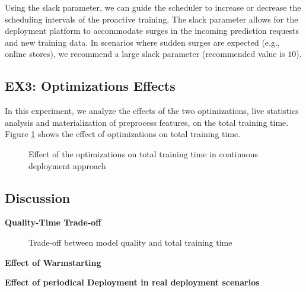 Using the slack parameter, we can guide the scheduler to increase or decrease the scheduling intervals of the proactive training.
The slack parameter allows for the deployment platform to accommodate surges in the incoming prediction requests and new training data.
In scenarios where sudden surges are expected (e.g., online stores), we recommend a large slack parameter (recommended value is $10$). 

\subsection{EX3: Optimizations Effects}
In this experiment, we analyze the effects of the two optimizations, live statistics analysis and materialization of preprocess features, on the total training time.
Figure \ref{optimization-effect} shows the effect of optimizations on total training time.
\begin{figure}[h!]
\centering
\resizebox{\columnwidth}{!}{}
\caption{Effect of the optimizations on total training time in continuous deployment approach}
\label{optimization-effect}
\end{figure}

\subsection{Discussion} \label{subsec:discussion}
\textbf{Quality-Time Trade-off}

\begin{figure}[!h]
\centering
\resizebox{\columnwidth}{!}{}
\caption{Trade-off between model quality and total training time}
\label{quality-vs-time}
\end{figure}

\textbf{Effect of Warmstarting}

\textbf{Effect of periodical Deployment in real deployment scenarios}




